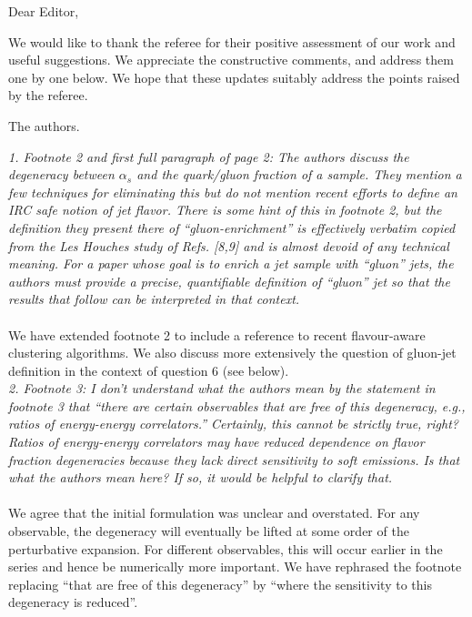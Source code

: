 \documentclass[a4paper,11pt]{article}
\begin{document}
%
\vspace{0.3cm}

\noindent Dear Editor, 
\vspace{0.3cm}

We would like to thank the referee for their positive assessment of our work and useful suggestions. We appreciate the constructive comments, and address them one by one below. We hope that these updates suitably address the points raised by the referee.

\vspace{0.3cm}
\noindent The authors.

\vspace{0.6cm}

\vspace{0.3cm}

\noindent \textit{1. Footnote 2 and first full paragraph of page 2: The authors discuss the degeneracy between $\alpha_s$ and the quark/gluon fraction of a sample. They mention a few techniques for eliminating this but do not mention recent efforts to define an IRC safe notion of jet flavor. There is some hint of this in footnote 2, but the definition they present there of “gluon-enrichment” is effectively verbatim copied from the Les Houches study of Refs. [8,9] and is almost devoid of any technical meaning. For a paper whose goal is to enrich a jet sample with “gluon” jets, the authors must provide a precise, quantifiable definition of “gluon” jet so that the results that follow can be interpreted in that context.}
\\
\\
We have extended footnote 2 to include a reference to recent flavour-aware clustering algorithms. We also discuss more extensively the question of gluon-jet definition in the context of question 6 (see below).
\\

\noindent \textit{2. Footnote 3: I don’t understand what the authors mean by the statement in footnote 3 that “there are certain observables that are free of this degeneracy, e.g., ratios of energy-energy correlators.” Certainly, this cannot be strictly true, right? Ratios of energy-energy correlators may have reduced dependence on flavor fraction degeneracies because they lack direct sensitivity to soft emissions. Is that what the authors mean here? If so, it would be helpful to clarify that.
}
\\
\\
We agree that the initial formulation was unclear and overstated. For any observable, the degeneracy will eventually be lifted at some order of the perturbative expansion. For different observables, this will occur earlier in the series and hence be numerically more important. We have rephrased the footnote replacing “that are free of this degeneracy” by “where the sensitivity to this degeneracy is reduced”.
\\
\end{document}
